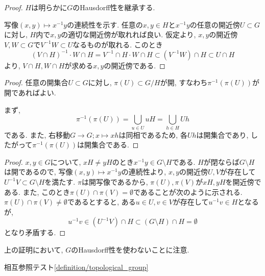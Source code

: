     \begin{proof}
        $H$は明らかに$G$のHausdorff性を継承する.

        写像$(x,y)\mapsto x^{-1}y$の連続性を示す.
        任意の$x, y\in H$と$x^{-1}y$の任意の開近傍$U\subset G$に対し,
        $H$内で$x, y$の適切な開近傍が取れれば良い.
        仮定より, $x, y$の開近傍$V, W\subset G$で$V^{-1}W\subset U$なるものが取れる.
        このとき
        \[(V\cap H)^{-1} \cdot W\cap H
        = V^{-1}\cap H \cdot W\cap H
        \subset (V^{-1}W) \cap H \subset U\cap H
        \]
        より, $V\cap H , W\cap H$が求める$x, y$の開近傍である.
    \end{proof}

    \begin{proposition}
        
    \end{proposition}

    \begin{proof}
        任意の開集合$U\subset G$に対し, $\pi(U)\subset G/H$が開,
        すなわち$\pi^{-1}(\pi(U))$が開であればよい.

        まず,
        \[\pi^{-1}(\pi(U)) = \bigcup_{u\in U}uH = \bigcup_{h\in H}Uh
        \]
        である.
        また, 右移動$G\to G ;x\mapsto xh$は同相であるため,
        各$Uh$は開集合であり,
        したがって$\pi^{-1}(\pi(U))$は開集合である.
    \end{proof}

    \begin{proposition}
        
    \end{proposition}

    \begin{proof}
        $x, y\in G$について, $xH \neq yH$のとき$x^{-1}y\in G\setminus H$である.
        $H$が閉ならば$G\setminus H$は開であるので,
        写像$(x,y)\mapsto x^{-1}y$の連続性より,
        $x, y$の開近傍$U, V$が存在して$U^{-1}V\subset G\setminus H$を満たす.
        $\pi$は開写像であるから, $\pi(U), \pi(V)$が$xH, yH$を開近傍である.
        また, このとき$\pi(U)\cap \pi(V)= \emptyset$であることが次のように示される.
        $\pi(U)\cap \pi(V)\neq \emptyset$であるとすると,
        ある$u\in U, v\in V$が存在して$u^{-1}v\in H$となるが,
        \[u^{-1}v \in (U^{-1}V)\cap H \subset (G\setminus H)\cap H = \emptyset
        \]
        となり矛盾する.
    \end{proof}
    上の証明において, $G$のHausdorff性を使わないことに注意.


    相互参照テスト\ref{definition/topological_group}

